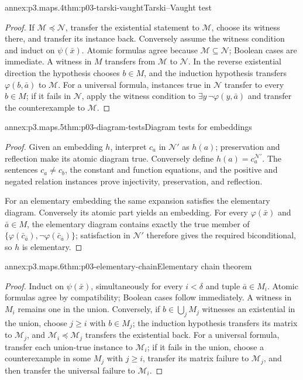 \begin{annexitem}{annex:p3.maps.4}{thm:p03-tarski-vaught}{Tarski--Vaught test}
\begin{proof}
If \(\mathcal M\preccurlyeq\mathcal N\), transfer the existential statement
to \(\mathcal M\), choose its witness there, and transfer its instance back.
Conversely assume the witness condition and induct on \(\psi(\bar x)\).
Atomic formulas agree because \(\mathcal M\subseteq\mathcal N\); Boolean cases
are immediate.  A witness in \(M\) transfers from \(\mathcal M\) to
\(\mathcal N\).  In the reverse existential direction the hypothesis chooses
\(b\in M\), and the induction hypothesis transfers
\(\varphi(b,\bar a)\) to \(\mathcal M\).  For a universal formula, instances
true in \(\mathcal N\) transfer to every \(b\in M\); if it fails in
\(\mathcal N\), apply the witness condition to
\(\exists y\,\neg\varphi(y,\bar a)\) and transfer the counterexample to
\(\mathcal M\).
\end{proof}
\end{annexitem}

\begin{annexitem}{annex:p3.maps.5}{thm:p03-diagram-tests}{Diagram tests for embeddings}
\begin{proof}
Given an embedding \(h\), interpret \(c_a\) in \(\mathcal N'\) as \(h(a)\);
preservation and reflection make its atomic diagram true.  Conversely define
\(h(a)=c_a^{\mathcal N'}\).  The sentences \(c_a\ne c_b\), the constant and
function equations, and the positive and negated relation instances prove
injectivity, preservation, and reflection.

For an elementary embedding the same expansion satisfies the elementary
diagram.  Conversely its atomic part yields an embedding.  For every
\(\varphi(\bar x)\) and \(\bar a\in M\), the elementary diagram contains
exactly the true member of
\(\{\varphi(\bar c_{\bar a}),\neg\varphi(\bar c_{\bar a})\}\); satisfaction
in \(\mathcal N'\) therefore gives the required biconditional, so \(h\) is
elementary.
\end{proof}
\end{annexitem}

\begin{annexitem}{annex:p3.maps.6}{thm:p03-elementary-chain}{Elementary chain theorem}
\begin{proof}
Induct on \(\psi(\bar x)\), simultaneously for every \(i<\delta\) and tuple
\(\bar a\in M_i\).  Atomic formulas agree by compatibility; Boolean cases
follow immediately.  A witness in \(M_i\) remains one in the union.  Conversely,
if \(b\in\bigcup_jM_j\) witnesses an existential in the union, choose
\(j\ge i\) with \(b\in M_j\); the induction hypothesis transfers its matrix
to \(\mathcal M_j\), and
\(\mathcal M_i\preccurlyeq\mathcal M_j\) transfers the existential back.
For a universal formula, transfer each union-true instance to
\(\mathcal M_i\); if it fails in the union, choose a counterexample in some
\(M_j\) with \(j\ge i\), transfer its matrix failure to \(\mathcal M_j\),
and then transfer the universal failure to \(\mathcal M_i\).
\end{proof}
\end{annexitem}
